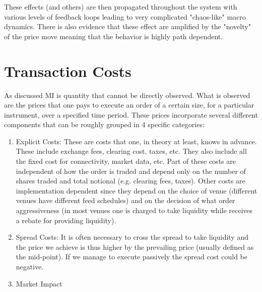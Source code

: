 These effects (and others) are then propagated throughout the system with various levels of feedback loops leading to very complicated "chaos-like" macro dynamics. There is also evidence that these effect are amplified by the "novelty" of the price move meaning that the behavior is highly path dependent. 

\section{Transaction Costs}
As discussed MI is quantity that cannot be directly observed. What is observed are the prices that one pays to execute an order of a certain size, for a particular instrument, over a specified time period.  These prices incorporate several different components that can be roughly grouped in 4 specific categories:
\begin{enumerate}
\item Explicit Costs: These are costs that one, in theory at least, knows in advance. These include exchange fees, clearing cost, taxes, etc. They also include all the fixed cost for connectivity, market data, etc. Part of these costs are independent of how the order is traded and depend only on the number of shares traded and total notional (e.g. clearing fees, taxes). Other costs are implementation dependent since they depend on the choice of venue (different venues have different feed schedules) and on the decision of what order aggressiveness (in most venues one is charged to take liquidity while receives a rebate for providing liquidity).
\item Spread Costs: It is often necessary to cross the spread to take liquidity and the price we achieve is thus higher by the prevailing price (usually defined as the mid-point). If we manage to execute passively the spread cost could be negative.
\item Market Impact



\end{enumerate}
